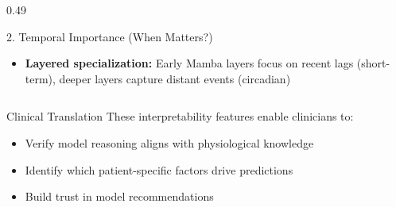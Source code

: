 \documentclass[aspectratio=169,xcolor=dvipsnames]{beamer}
\begin{document}
\begin{frame}
\begin{columns}[T]
\begin{column}{0.49\textwidth}
\begin{block}{2. Temporal Importance (When Matters?)}
\begin{itemize}
                    \item \textbf{Layered specialization:} Early Mamba layers focus on recent lags (short-term), deeper layers capture distant events (circadian)
                \end{itemize}
            \end{block}
        \end{column}
    \end{columns}
     \begin{alertblock}{Clinical Translation}
        These interpretability features enable clinicians to:
        \begin{itemize}
            \item Verify model reasoning aligns with physiological knowledge
            \item Identify which patient-specific factors drive predictions
            \item Build trust in model recommendations
        \end{itemize}
    \end{alertblock}
  
\end{frame}
\end{document}
